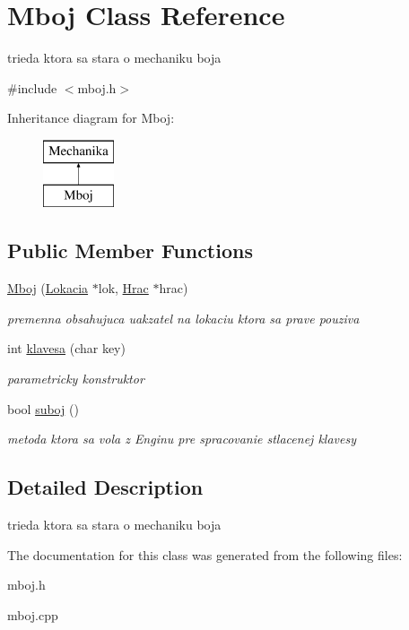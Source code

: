 \hypertarget{class_mboj}{\section{Mboj Class Reference}
\label{class_mboj}
}


trieda ktora sa stara o mechaniku boja  




{\ttfamily \#include $<$mboj.\-h$>$}

Inheritance diagram for Mboj\-:\begin{figure}[H]
\begin{center}
\leavevmode
\includegraphics[height=2.000000cm]{class_mboj}
\end{center}
\end{figure}
\subsection*{Public Member Functions}
\begin{DoxyCompactItemize}
\item 
\hypertarget{class_mboj_a5c13a2d312899fbbc1a843bbdf2adae4}{\hyperlink{class_mboj_a5c13a2d312899fbbc1a843bbdf2adae4}{Mboj} (\hyperlink{class_lokacia}{Lokacia} $\ast$lok, \hyperlink{class_hrac}{Hrac} $\ast$hrac)}\label{class_mboj_a5c13a2d312899fbbc1a843bbdf2adae4}

\begin{DoxyCompactList}\small\item\em premenna obsahujuca uakzatel na lokaciu ktora sa prave pouziva \end{DoxyCompactList}\item 
\hypertarget{class_mboj_a443d2c40b47d934566b43f92f171ef08}{int \hyperlink{class_mboj_a443d2c40b47d934566b43f92f171ef08}{klavesa} (char key)}\label{class_mboj_a443d2c40b47d934566b43f92f171ef08}

\begin{DoxyCompactList}\small\item\em parametricky konstruktor \end{DoxyCompactList}\item 
\hypertarget{class_mboj_a94ea1bd996a151398df2892654263f93}{bool \hyperlink{class_mboj_a94ea1bd996a151398df2892654263f93}{suboj} ()}\label{class_mboj_a94ea1bd996a151398df2892654263f93}

\begin{DoxyCompactList}\small\item\em metoda ktora sa vola z Enginu pre spracovanie stlacenej klavesy \end{DoxyCompactList}\end{DoxyCompactItemize}


\subsection{Detailed Description}
trieda ktora sa stara o mechaniku boja 

The documentation for this class was generated from the following files\-:\begin{DoxyCompactItemize}
\item 
mboj.\-h\item 
mboj.\-cpp\end{DoxyCompactItemize}
